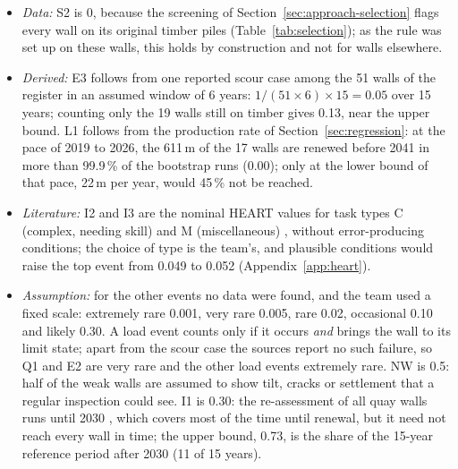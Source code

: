 \begin{itemize}
  \item \emph{Data:} S2 is 0, because the screening of
    Section~\ref{sec:approach-selection} flags every wall on its original timber
    piles (Table~\ref{tab:selection}); as the rule was set up on these walls,
    this holds by construction and not for walls elsewhere.
  \item \emph{Derived:} E3 follows from one reported scour case
    \parencite{wijkbericht2024walmuur} among the 51 walls of the register in an
    assumed window of 6 years: $1/(51 \times 6) \times 15 = 0.05$ over 15 years;
    counting only the 19 walls still on timber gives 0.13, near the upper bound.
    L1 follows from the production rate of Section~\ref{sec:regression}: at the
    pace of 2019 to 2026, the 611\,m of the 17 walls are renewed before 2041 in
    more than 99.9\,\% of the bootstrap runs (0.00); only at the lower bound of
    that pace, 22\,m per year, would 45\,\% not be reached.
  \item \emph{Literature:} I2 and I3 are the nominal HEART values for task types C
    (complex, needing skill) and M (miscellaneous)
    \parencite{williams1986heart,heart_table_plos2021}, without error-producing
    conditions; the choice of type is the team's, and plausible conditions would
    raise the top event from 0.049 to 0.052 (Appendix~\ref{app:heart}).
  \item \emph{Assumption:} for the other events no data were found, and the team
    used a fixed scale: extremely rare 0.001, very rare 0.005, rare 0.02,
    occasional 0.10 and likely 0.30. A load event counts only if it occurs
    \emph{and} brings the wall to its limit state; apart from the scour case the
    sources report no such failure, so Q1 and E2 are very rare and the other load
    events extremely rare. NW is 0.5: half of the weak walls are assumed to show
    tilt, cracks or settlement that a regular inspection could see. I1 is 0.30:
    the re-assessment of all quay walls runs until 2030
    \parencite{utrecht_teamchallenge2026}, which covers most of the time until
    renewal, but it need not reach every wall in time; the upper bound, 0.73, is
    the share of the 15-year reference period after 2030 (11 of 15 years).
\end{itemize}


